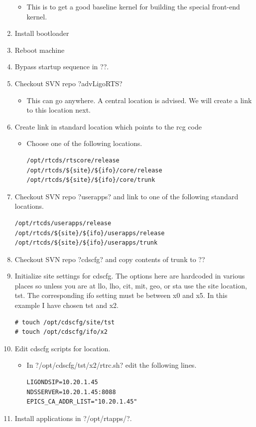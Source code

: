 \begin{enumerate}
\begin{itemize}
\item This is to get a good baseline kernel for building the special
    front-end kernel.
\end{itemize}
\item Install bootloader
\item Reboot machine
\item Bypass startup sequence in \lstin?\etc\inittab?.
\item Checkout SVN repo \lstin?advLigoRTS?
\begin{itemize}
\item This can go anywhere. A central location is advised. We will create a
    link to this location next.
\end{itemize}
\item Create link in standard location which points to the rcg code
\begin{itemize}
\item Choose one of the following locations.
\begin{lstlisting}
/opt/rtcds/rtscore/release
/opt/rtcds/${site}/${ifo}/core/release
/opt/rtcds/${site}/${ifo}/core/trunk
\end{lstlisting}
\end{itemize}
\item Checkout SVN repo \lstin?userapps? and link to one of the following
standard locations.
\begin{lstlisting}
/opt/rtcds/userapps/release
/opt/rtcds/${site}/${ifo}/userapps/release
/opt/rtcds/${site}/${ifo}/userapps/trunk
\end{lstlisting}
\item Checkout SVN repo \lstin?cdscfg? and copy contents of trunk to \lstin?\opt\cdscfg?
\item Initialize site settings for cdscfg. The options here are hardcoded in
various places so unless you are at llo, lho, cit, mit, geo, or sta use the site
location, tst. The corresponding ifo setting must be between x0 and x5. In this
example I have chosen tst and x2.
\begin{lstlisting}
# touch /opt/cdscfg/site/tst
# touch /opt/cdscfg/ifo/x2
\end{lstlisting}
\item Edit cdscfg scripts for location.
\begin{itemize}
\item In \lstin?/opt/cdscfg/tst/x2/rtrc.sh? edit the following lines.
\begin{lstlisting}
LIGONDSIP=10.20.1.45
NDSSERVER=10.20.1.45:8088
EPICS_CA_ADDR_LIST="10.20.1.45"
\end{lstlisting}
\end{itemize}
\item Install applications in \lstin?/opt/rtapps/?.
\end{enumerate}


